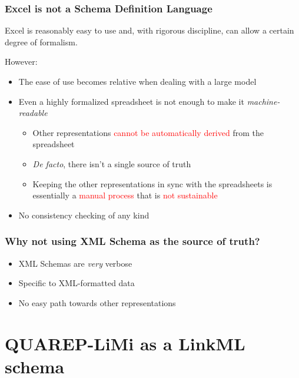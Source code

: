 \begin{frame}
  \frametitle{Excel is not a Schema Definition Language}

  Excel is reasonably easy to use and, with rigorous discipline, can allow a
  certain degree of formalism.

  \bigskip
  However:
  \begin{itemize}
    \item The ease of use becomes relative when dealing with a large model
    \item Even a highly formalized spreadsheet is not enough to make it \emph{machine-readable}
      \begin{itemize}
        \item Other representations \textcolor<2>{red}{cannot be automatically derived}
              from the spreadsheet
        \item \emph{De facto}, there isn't a single source of truth
        \item Keeping the other representations in sync with the spreadsheets is essentially a
              \textcolor<3>{red}{manual process} that is \textcolor<3>{red}{not sustainable}
      \end{itemize}
    \item No consistency checking of any kind
  \end{itemize}
\end{frame}

\begin{frame}
  \frametitle{Why not using XML Schema as the source of truth?}

  \begin{itemize}
    \item XML Schemas are \emph{very} verbose
    \item Specific to XML-formatted data
    \item No easy path towards other representations
  \end{itemize}
\end{frame}

\section{QUAREP-LiMi as a LinkML schema}

